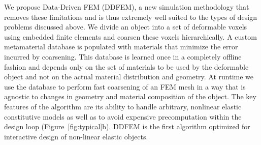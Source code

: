 We propose Data-Driven FEM (DDFEM), a new simulation methodology
that removes these limitations and is thus extremely well suited
to the types of design problems discussed above.
We divide an object into a set of deformable voxels using embedded finite
elements and coarsen these voxels hierarchically.
A custom metamaterial database is populated with materials that minimize the error incurred by coarsening.
This database is learned once in a completely offline fashion and depends only on the set of materials to be used by the deformable object and not on the actual material distribution
and geometry.
At runtime we use the database to perform fast coarsening of an FEM mesh in a way that is agnostic to changes in geometry and material composition of the object.
The key features of the algorithm are its ability to handle arbitrary, nonlinear elastic
constitutive models as well as to avoid expensive precomputation
within the design loop (Figure~\ref{fig:typical}b).
DDFEM is the first algorithm optimized for interactive design of non-linear elastic objects.

